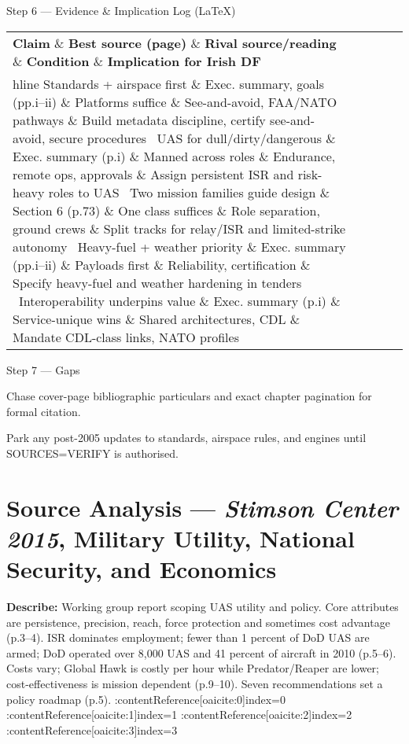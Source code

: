 Step 6 — Evidence \& Implication Log (LaTeX)

\begin{tabular}{p{3.2cm}p{4.2cm}p{3.6cm}p{3.2cm}p{4.2cm}}
	\textbf{Claim} \& \textbf{Best source (page)} \& \textbf{Rival source/reading} \& \textbf{Condition} \& \textbf{Implication for Irish DF}\\hline
	Standards + airspace first \& Exec. summary, goals (pp.i–ii) \& Platforms suffice \& See-and-avoid, FAA/NATO pathways \& Build metadata discipline, certify see-and-avoid, secure procedures \
	UAS for dull/dirty/dangerous \& Exec. summary (p.i) \& Manned across roles \& Endurance, remote ops, approvals \& Assign persistent ISR and risk-heavy roles to UAS \
	Two mission families guide design \& Section 6 (p.73) \& One class suffices \& Role separation, ground crews \& Split tracks for relay/ISR and limited-strike autonomy \
	Heavy-fuel + weather priority \& Exec. summary (pp.i–ii) \& Payloads first \& Reliability, certification \& Specify heavy-fuel and weather hardening in tenders \
	Interoperability underpins value \& Exec. summary (p.i) \& Service-unique wins \& Shared architectures, CDL \& Mandate CDL-class links, NATO profiles \
\end{tabular}

Step 7 — Gaps

Chase cover-page bibliographic particulars and exact chapter pagination for formal citation.

Park any post-2005 updates to standards, airspace rules, and engines until SOURCES=VERIFY is authorised.

\parencite{STIMSON_2015}
\section*{Source Analysis — \textit{Stimson Center 2015}, Military Utility, National Security, and Economics}
\textbf{Describe:} Working group report scoping UAS utility and policy. Core attributes are persistence, precision, reach, force protection and sometimes cost advantage (p.3–4). ISR dominates employment; fewer than 1 percent of DoD UAS are armed; DoD operated over 8{,}000 UAS and 41 percent of aircraft in 2010 (p.5–6). Costs vary; Global Hawk is costly per hour while Predator/Reaper are lower; cost-effectiveness is mission dependent (p.9–10). Seven recommendations set a policy roadmap (p.5). :contentReference[oaicite:0]{index=0} :contentReference[oaicite:1]{index=1} :contentReference[oaicite:2]{index=2} :contentReference[oaicite:3]{index=3}

